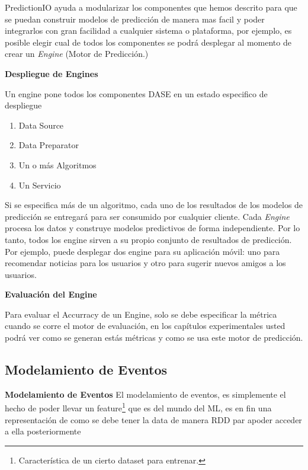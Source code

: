 PredictionIO ayuda a modularizar los componentes que hemos descrito  para que se puedan construir modelos de predicción de manera mas facil y poder integrarlos con gran facilidad a cualquier sistema o plataforma, por ejemplo, es posible elegir cual de todos los componentes se podrá desplegar al momento de crear un \emph{Engine} (Motor de Predicción.)




\textbf{Despliegue de Engines}

  Un engine pone todos los componentes DASE en un estado especifico de despliegue

  \begin{enumerate}
    \item Data Source
    \item Data Preparator
    \item Un o más Algoritmos
    \item Un Servicio

  \end{enumerate}

  Si se especifica más de un algoritmo, cada uno de los resultados de los modelos de predicción se entregará para ser consumido por cualquier cliente.
  Cada \emph{Engine} procesa los datos y construye modelos predictivos de forma independiente. Por lo tanto, todos los engine sirven a su propio conjunto de resultados de predicción. Por ejemplo, puede desplegar dos engine para su aplicación móvil: uno para recomendar noticias para los usuarios y otro para sugerir nuevos amigos a los usuarios.



\textbf{Evaluación del Engine }

  Para evaluar el Accurracy de un Engine, solo se debe especificar la métrica cuando se corre el motor de evaluación, en los capítulos experimentales usted podrá ver como se generan estás métricas y como se usa este motor de predicción.











\subsection{Modelamiento de Eventos}



\textbf{Modelamiento de Eventos}
  El modelamiento de eventos, es simplemente el hecho de poder llevar un feature\footnote{Característica de un cierto dataset para entrenar.}   que es del mundo del ML, es en fin una representación de como se debe tener la data de manera RDD par apoder acceder a ella posteriormente 

